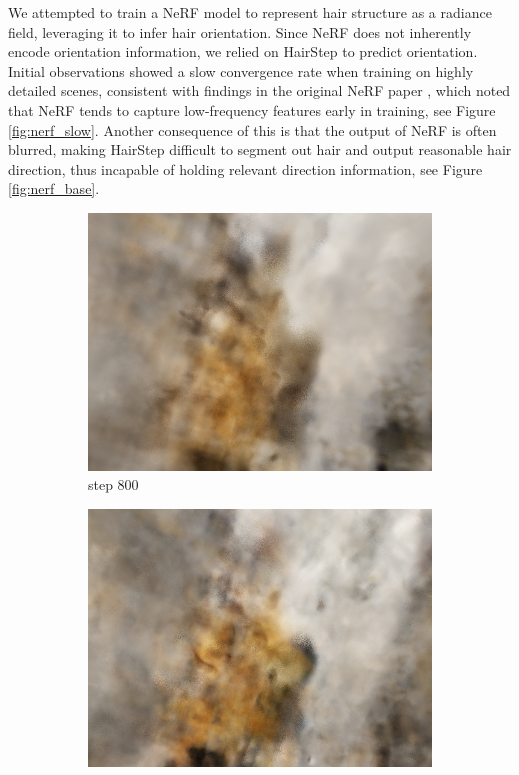 \documentclass[12pt]{article}
\begin{document}
  We attempted to train a NeRF model to represent hair structure as a radiance field, leveraging it to infer hair orientation. Since NeRF does not inherently encode orientation information, we relied on HairStep to predict orientation. Initial observations showed a slow convergence rate when training on highly detailed scenes, consistent with findings in the original NeRF paper \cite{mildenhall_nerf_2020}, which noted that NeRF tends to capture low-frequency features early in training, see Figure \ref{fig:nerf_slow}. Another consequence of this is that the output of NeRF is often blurred, making HairStep difficult to segment out hair and output reasonable hair direction, thus incapable of holding relevant direction information, see Figure \ref{fig:nerf_base}.
  \begin{figure}[h]
      \centering
      \begin{subfigure}{0.3\textwidth}
            \centering
            \includegraphics[width=\textwidth]{project-milestone/images/nerf_pred/nerf_800.png}
            \caption{step 800}
        \end{subfigure}
        \hfill
        \begin{subfigure}{0.3\textwidth}
            \centering
            \includegraphics[width=\textwidth]{project-milestone/images/nerf_pred/nerf_4000.png}

\end{subfigure}
\end{figure}
\end{document}
